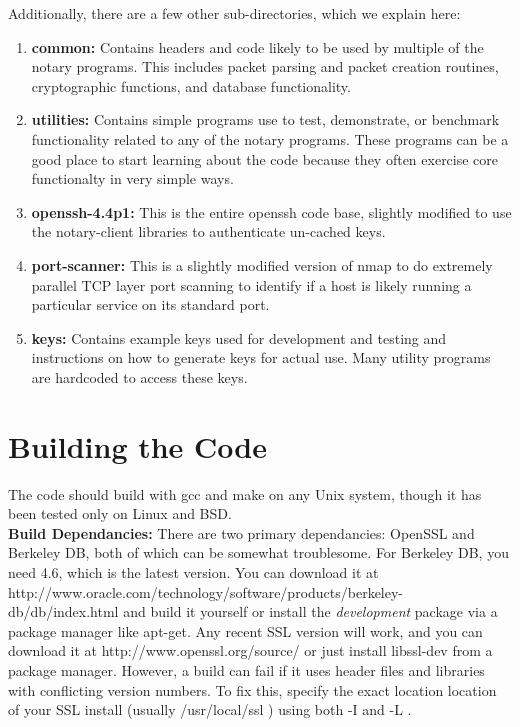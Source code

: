 \documentclass[pdftex,singlecolumn,11pt,letterpaper]{article}
\begin{document}
\noindent 
Additionally, there are a few other sub-directories, which we explain here:
\begin{enumerate}
\item \textbf{common:}  Contains headers and code likely to be used by multiple
of the notary programs.  This includes packet parsing and packet creation 
routines, cryptographic functions, and database functionality.  
\item \textbf{utilities:} Contains simple programs use to test, demonstrate,
or benchmark functionality related to any of the notary programs.  These 
programs can be a good place to start learning about the code because they 
often exercise core functionalty in very simple ways. 
\item \textbf{openssh-4.4p1:}  This is the entire openssh code base, slightly
modified to use the notary-client libraries to authenticate un-cached keys.  
\item \textbf{port-scanner:} This is a slightly modified version of nmap to 
do extremely parallel TCP layer port scanning to identify if a host is likely
running a particular service on its standard port.  
\item \textbf{keys:} Contains example keys used for development and testing 
and instructions on how to generate keys for actual use.  Many utility programs
are hardcoded to access these keys.   
\end{enumerate}

\section{Building the Code}

The code should build with gcc and make on any Unix system, though it has
been tested only on Linux and BSD. \\  

\noindent\textbf{Build Dependancies:} There are two primary dependancies:
OpenSSL and Berkeley DB, both of which can be somewhat troublesome.   
For Berkeley DB, you need 4.6, which is the latest version.  You can 
download it at http://www.oracle.com/technology/software/products/berkeley-db/db/index.html and build it yourself or install the \emph{development} package
via a package manager like apt-get.  Any recent SSL version will work, and
you can download it at http://www.openssl.org/source/ or just install 
libssl-dev from a package manager.  However, a build
can fail if it uses header files and libraries with conflicting version 
numbers.  To fix this, specify the exact location location of your SSL 
install (usually /usr/local/ssl ) using both -I and -L . \\ 
\end{document}
